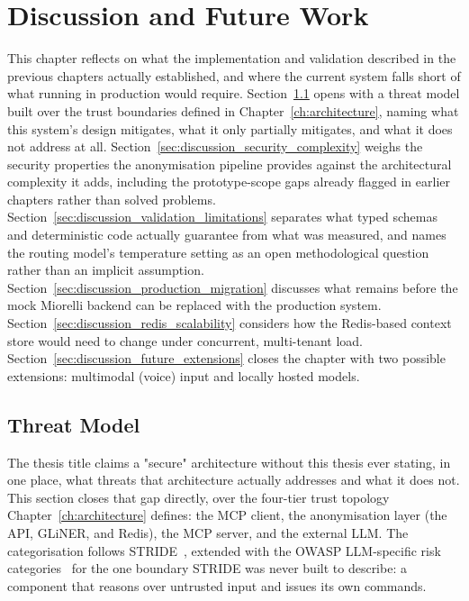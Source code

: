 \chapter{Discussion and Future Work}
\label{ch:discussion}

This chapter reflects on what the implementation and validation described in the previous chapters actually established, and where the current system falls short of what running in production would require. Section~\ref{sec:discussion_threat_model} opens with a threat model built over the trust boundaries defined in Chapter~\ref{ch:architecture}, naming what this system's design mitigates, what it only partially mitigates, and what it does not address at all. Section~\ref{sec:discussion_security_complexity} weighs the security properties the anonymisation pipeline provides against the architectural complexity it adds, including the prototype-scope gaps already flagged in earlier chapters rather than solved problems. Section~\ref{sec:discussion_validation_limitations} separates what typed schemas and deterministic code actually guarantee from what was measured, and names the routing model's temperature setting as an open methodological question rather than an implicit assumption. Section~\ref{sec:discussion_production_migration} discusses what remains before the mock Miorelli backend can be replaced with the production system. Section~\ref{sec:discussion_redis_scalability} considers how the Redis-based context store would need to change under concurrent, multi-tenant load. Section~\ref{sec:discussion_future_extensions} closes the chapter with two possible extensions: multimodal (voice) input and locally hosted models.

\section{Threat Model}
\label{sec:discussion_threat_model}

The thesis title claims a "secure" architecture without this thesis ever stating, in one place, what threats that architecture actually addresses and what it does not. This section closes that gap directly, over the four-tier trust topology Chapter~\ref{ch:architecture} defines: the MCP client, the anonymisation layer (the API, GLiNER, and Redis), the MCP server, and the external LLM. The categorisation follows STRIDE~\cite{shostack2014threatmodeling}, extended with the OWASP LLM-specific risk categories~\cite{owasp2025llmtop10} for the one boundary STRIDE was never built to describe: a component that reasons over untrusted input and issues its own commands.

